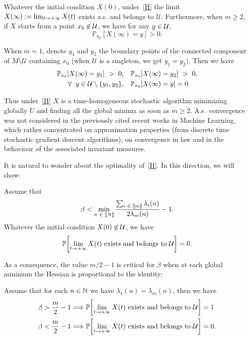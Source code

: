 \documentclass[AHL,Unicode,longabstracts,published]{cedram}
\newcommand{\f}[2]{\frac{#1}{#2}}
\newcommand{\cU}{\mathcal{U}}
\newcommand{\NN}{\mathbb{N}}
\newcommand{\PP}{\mathbb{P}}
\newcommand{\iy}{\infty}
\newcommand{\fo}{\forall\ }
\let\originalleft\left
\let\originalright\right
\renewcommand{\left}{\mathopen{}\mathclose\bgroup\originalleft}
\renewcommand{\right}{\aftergroup\egroup\originalright}
\let\oldin\in
\renewcommand{\in}{\mathchoice{\oldin}{\oldin}{\,\oldin\,}{\,\oldin\,}}
\renewcommand*{\to}{\mathchoice{\longrightarrow}{\rightarrow}{\rightarrow}{\rightarrow}}
\newcommand*{\RightArrow}{\mathchoice{\Longrightarrow}{\Rightarrow}{\Rightarrow}{\Rightarrow}}
\let\oldforall\forall
\renewcommand*{\forall}{\mathrel{\oldforall}}
\newcommand{\llbracket}{\mathopen{[\mkern -2.7mu[}}
\newcommand{\rrbracket}{\mathclose{]\mkern -2.7mu]}}
\newcommand{\lin}{\llbracket}
\newcommand{\rin}{\rrbracket}
\begin{document}
\begin{theo}\label{theo1}
Whatever the initial condition $X(0)$, under~\eqref{H} the limit $X(\iy):=\lim_{t\to+\iy} X(t)$ exists a.s. and belongs to $\cU$. Furthermore, when $m\geq 2$, if $X$ starts from a point $x_0\not\in \cU$, we have for any $y\in \cU$,
\begin{equation*}
\PP_{x_0}[X(\iy)=y] > 0.
\end{equation*}


When $m=1$, denote $y_1$ and $y_2$ the boundary points of the connected component of $M\setminus\cU$ containing $x_0$ (when $\cU$ is a singleton, we get $y_1=y_2$). Then we have
\begin{align*}
 \PP_{x_0}[X(\iy)=y_1]\ >\ 0,\quad &\PP_{x_0}[X(\iy)=y_2]\ >\ 0, \\ 
\fo y\in\cU\setminus\{y_1,y_2\},\quad &\PP_{x_0}[X(\iy)=y]=0.
\end{align*}
\end{theo}


Thus under~\eqref{H} $X$ is a time-homogeneous stochastic algorithm minimizing global\-ly $U$ and finding all the global minima as soon as $m\geq 2$. A.s.\ convergence was not considered in the previously cited recent works in Machine Learning, which rather concentrated on approximation properties (from discrete time stochastic gradient descent algorithms), on convergence in law and in the behaviour of the associated invariant measures.


It is natural to wonder about the optimality of~\eqref{H}. In this direction, we will show:

\begin{theo}\label{theo2}
Assume that
\begin{equation}\label{H2}
\beta < \min_{n\in\lin N\rin}\f{\sum_{i\in\lin m\rin}\lambda_i(n)}{2\lambda_m(n)}-1.
\end{equation}
Whatever the initial condition $X(0)\not\in\cU$, we have
\begin{equation*}
\PP\left[\lim_{t\to+\iy} X(t)\text{ exists and belongs to }\cU\right]= 0.
\end{equation*}
\end{theo}


As a consequence, the value $m/2-1$ is critical for $\beta$ when at each global minimum the Hessian is proportional to the identity:

\begin{coro}\label{coro}
Assume that for each $n\in\NN$ we have $\lambda_1(n)=\lambda_m(n)$, then we have
\begin{align*}
\beta>\f{m}2-1&\RightArrow \PP\left[\lim_{t\to +\iy} X(t)\text{ exists and belongs to }\cU\right]=1\\
\beta<\f{m}2-1&\RightArrow \PP\left[\lim_{t\to +\iy} X(t)\text{ exists and belongs to }\cU\right]=0.
\end{align*}
\end{coro}
\end{document}
